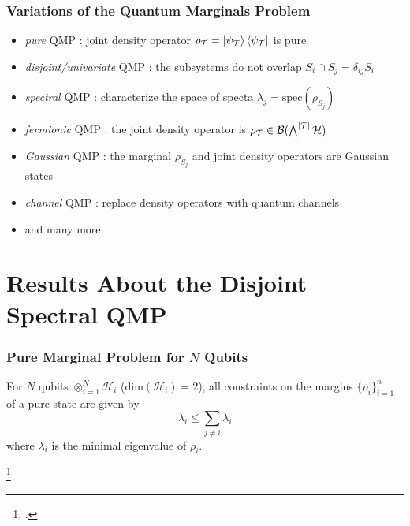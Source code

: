 \documentclass[
    9pt,
    hyperref={bookmarks=false, colorlinks=false}, %
    xcolor={dvipsnames},
]{beamer}
\begin{document}
\begin{frame}
    \frametitle{Variations of the Quantum Marginals Problem}
    \begin{itemize}
        \item \textit{pure} QMP : joint density operator $\rho_{\mathcal T} = \ket{\psi_{\mathcal T}}\bra{\psi_{\mathcal T}}$ is pure
        \item \textit{disjoint/univariate} QMP : the subsystems do not overlap $S_i \cap S_j = \delta_{ij} S_i$
        \item \textit{spectral} QMP : characterize the space of specta $\lambda_j  = \mathrm{spec}(\rho_{S_j})$
        \item \textit{fermionic} QMP : the joint density operator is $\rho_{\mathcal T} \in \mathcal B ( \bigwedge^{\abs{\mathcal T}} \mathcal H)$
        \item \textit{Gaussian} QMP : the marginal $\rho_{S_j}$ and joint density operators are Gaussian states
        \item \textit{channel} QMP : replace density operators with quantum channels
        \item and many more
    \end{itemize}
\end{frame}

\section{Results About the Disjoint Spectral QMP}
\begin{frame}
    \frametitle{Pure Marginal Problem for $N$ Qubits}
    \begin{theorem}
        For $N$ qubits $\otimes_{i=1}^{N} \mathcal H_i$ ($\mathrm{dim}(\mathcal H_i) = 2$), all constraints on the margins $\{ \rho_i \}_{i=1}^{n}$ of a pure state are given by 
        \[ \lambda_i \leq \sum_{j \neq i} \lambda_i \]
        where $\lambda_i$ is the minimal eigenvalue of $\rho_i$.
    \end{theorem}
    \footcitetext{higuchi2003one}
\end{frame}
\end{document}
